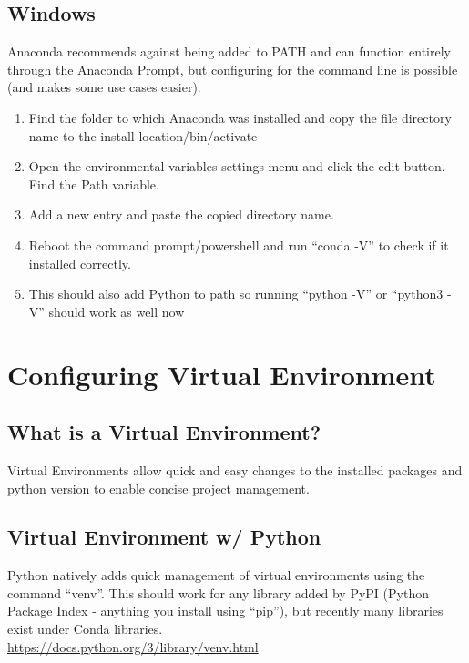 \documentclass[12pt]{article}
\begin{document}
        \subsection{Windows}
            Anaconda recommends against being added to PATH and can function entirely through the Anaconda Prompt,
            but configuring for the command line is possible (and makes some use cases easier).
            \begin{enumerate}
                \item Find the folder to which Anaconda was installed and copy the file directory name to the \textlangle install location\textrangle /bin/activate
                \item Open the environmental variables settings menu and click the edit button. Find the Path variable.
                \item Add a new entry and paste the copied directory name.
                \item Reboot the command prompt/powershell and run “conda -V” to check if it installed correctly.
                \item This should also add Python to path so running “python -V” or “python3 -V” should work as well now
            \end{enumerate}
    \section{Configuring Virtual Environment}
        \subsection{What is a Virtual Environment?}
            Virtual Environments allow quick and easy changes to the installed packages and python version to enable concise project management.
        \subsection{Virtual Environment w/ Python}
            Python natively adds quick management of virtual environments using the command ``venv''.
            This should work for any library added by PyPI (Python Package Index - anything you install using ``pip''), but recently many libraries exist under Conda libraries.
            \\\url{https://docs.python.org/3/library/venv.html}
\end{document}
